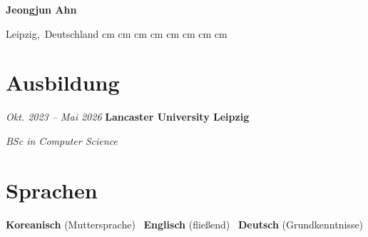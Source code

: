 \documentclass[german]{cv}
\begin{document}
    \placelastupdatedtext
    \begin{header}
        \textbf{\fontsize{24 pt}{24 pt}\selectfont Jeongjun Ahn}

        \vspace{0.3 cm}

        \normalsize
        \mbox{{\color{black}\footnotesize\faMapMarker*}\hspace*{0.13cm}Leipzig, Deutschland}%
         cm%
        \AND%
         cm%
        \mbox{}%
         cm%
        \AND%
         cm%
        \mbox{}%
         cm%
        \AND%
         cm%
        \mbox{}%
         cm%
        \AND%
         cm%
        \mbox{}%
    \end{header}

    \vspace{0.3 cm - 0.3 cm}


    \section{Ausbildung}

        \begin{twocolentry}{
        \textit{Okt. 2023 – Mai 2026}}
            \textbf{Lancaster University Leipzig}

            \textit{BSc in Computer Science}
        \end{twocolentry}

    \section{Sprachen}

        \begin{onecolentry}
            \textbf{Koreanisch} (Muttersprache) \textperiodcentered\ \textbf{Englisch} (fließend) \textperiodcentered\ \textbf{Deutsch} (Grundkenntnisse)
        \end{onecolentry}
\end{document}
